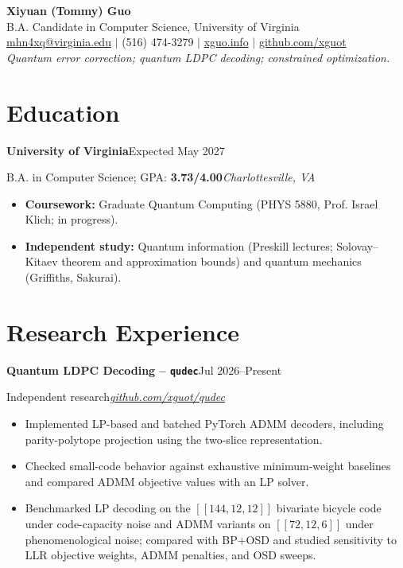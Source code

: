\documentclass[11pt, letterpaper]{article}
\newenvironment{cvitemize}{
    \begin{itemize}[leftmargin=0.18in, label=\textbullet,
        itemsep=2pt, parsep=0pt, topsep=3pt]
}{\end{itemize}}
\newcommand{\cvheading}[4]{
    \needspace{5\baselineskip}
    \textbf{#1}\hfill #2\par
    \nopagebreak
    #3\hfill\textit{#4}\par
    \nopagebreak
}
\begin{document}
\begin{center}
    {\LARGE\textbf{Xiyuan (Tommy) Guo}}\\[4pt]
    B.A. Candidate in Computer Science, University of Virginia\\[3pt]
    \small
    \href{mailto:mhn4xq@virginia.edu}{mhn4xq@virginia.edu}
    $\vert$ (516) 474-3279
    $\vert$ \href{https://xguo.info}{xguo.info}
    $\vert$ \href{https://github.com/xguot}{github.com/xguot}\\[4pt]
    \textit{Quantum error correction; quantum LDPC decoding; constrained optimization.}
\end{center}

\section{Education}
\cvheading{University of Virginia}{Expected May 2027}
    {B.A. in Computer Science; GPA: \textbf{3.73/4.00}}{Charlottesville, VA}
\begin{cvitemize}
    \item \textbf{Coursework:} Graduate Quantum Computing
    (PHYS 5880, Prof. Israel Klich; in progress).
    \item \textbf{Independent study:} Quantum information
    (Preskill lectures; Solovay--Kitaev theorem and approximation bounds)
    and quantum mechanics (Griffiths, Sakurai).
\end{cvitemize}

\section{Research Experience}

\cvheading{Quantum LDPC Decoding -- \texttt{qudec}}{Jul 2026--Present}
    {Independent research}
    {\href{https://github.com/xguot/qudec}{github.com/xguot/qudec}}
\begin{cvitemize}
    \item Implemented LP-based and batched PyTorch ADMM decoders,
    including parity-polytope projection using the two-slice representation.
    \item Checked small-code behavior against exhaustive minimum-weight
    baselines and compared ADMM objective values with an LP solver.
    \item Benchmarked LP decoding on the $[[144,12,12]]$ bivariate bicycle
    code under code-capacity noise and ADMM variants on $[[72,12,6]]$
    under phenomenological noise; compared with BP+OSD and studied
    sensitivity to LLR objective weights, ADMM penalties, and OSD sweeps.
\end{cvitemize}
\end{document}
